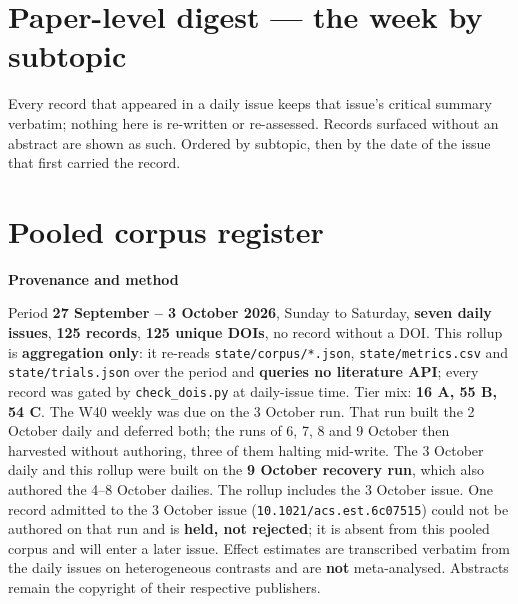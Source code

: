 \documentclass[10pt]{article}
\begin{document}
\clearpage

\section*{\sffamily\bfseries\color{Deep}Paper-level digest --- the week by subtopic}
\vspace{-1.5mm}{\color{Teal}\rule{\linewidth}{1.1pt}}\vspace{1mm}

{\fontsize{7.4}{9}\selectfont\color{Slate}Every record that appeared in a daily issue
keeps that issue's critical summary verbatim; nothing here is re-written or re-assessed.
Records surfaced without an abstract are shown as such. Ordered by subtopic, then by the
date of the issue that first carried the record.\par}



\section*{\sffamily\bfseries\color{Deep}Pooled corpus register}
\vspace{-1.5mm}{\color{Teal}\rule{\linewidth}{1.1pt}}\vspace{2.5mm}



\vspace{4mm}
\begin{keybox}
{\sffamily\bfseries\footnotesize\color{Deep}Provenance and method}\\[1.2mm]
{\fontsize{7.2}{8.8}\selectfont
Period \textbf{27 September -- 3 October 2026}, Sunday to Saturday, \textbf{seven daily issues},
\textbf{125 records}, \textbf{125 unique DOIs}, no record without a DOI. This rollup is
\textbf{aggregation only}: it re-reads \texttt{state/corpus/*.json}, \texttt{state/metrics.csv} and
\texttt{state/trials.json} over the period and \textbf{queries no literature API}; every record was
gated by \texttt{check\_dois.py} at daily-issue time. Tier mix: \textbf{16 A, 55 B, 54 C}. The W40
weekly was due on the 3 October run. That run built the 2 October daily and deferred both; the runs of
6, 7, 8 and 9 October then harvested without authoring, three of them halting mid-write. The 3 October
daily and this rollup were built on the \textbf{9 October recovery run}, which also authored the
4--8 October dailies. The rollup includes the 3 October issue. One record admitted to the 3 October
issue (\texttt{10.1021/acs.est.6c07515}) could not be authored on that run and is \textbf{held, not
rejected}; it is absent from this pooled corpus and will enter a later issue.
Effect estimates are transcribed verbatim from the daily issues on heterogeneous contrasts and are
\textbf{not} meta-analysed. Abstracts remain the copyright of their respective publishers.\par}
\end{keybox}
\end{document}
